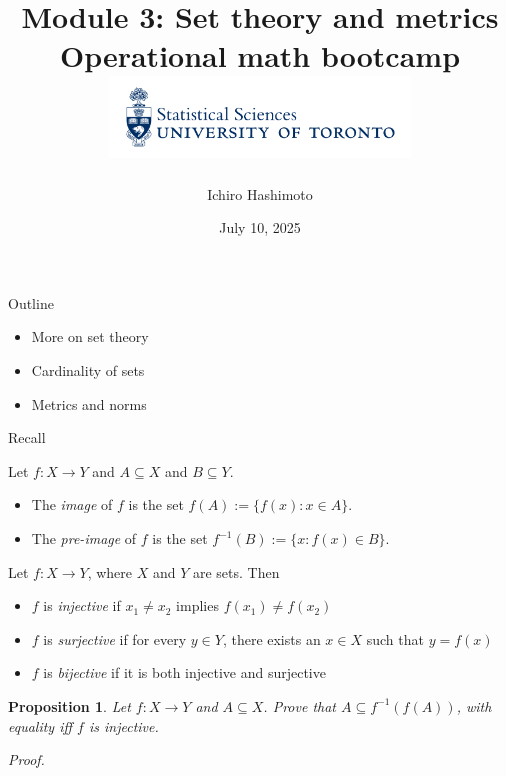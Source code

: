 \documentclass [aspectratio=169]{beamer}
\title[]{Module 3: Set theory and metrics \\ {\large Operational math bootcamp}\\ \includegraphics[width=8cm]{dept_logo.png}\vspace{-1em}}
\author[]{Ichiro Hashimoto}
\institute[]{University of Toronto}
\date{July 10,  2025}
\newtheorem{proposition}[theorem]{Proposition}
\begin{document}
{
\begin{frame}
    \titlepage
\end{frame}
}

\begin{frame}{Outline}
    \begin{itemize}
      \setlength\itemsep{1em}
    	\item More on set theory
	\item Cardinality of sets
	\item Metrics and norms
    \end{itemize}
\end{frame}

\begin{frame}{Recall}
\begin{definition}
Let $f:X \to Y$ and $A \subseteq X$ and $B \subseteq Y$. 
\begin{itemize}
\item The \emph{image} of $f$ is the set $f(A) := \{f(x): x \in A \}$.
\item The \emph{pre-image} of $f$ is the set $f^{-1}(B) := \{x: f(x) \in B \}$.
\end{itemize}
\end{definition}

\vspace{1em}


\begin{definition}
Let $f:X \to Y$, where $X$ and $Y$ are sets. Then
\begin{itemize}
    \item $f$ is \emph{injective} if $x_1 \neq x_2$ implies $f(x_1) \neq f(x_2)$
    \item $f$ is \emph{surjective} if for every $y \in Y$, there exists an $x \in X$ such that $y = f(x)$
    \item $f$ is \emph{bijective} if it is both injective and surjective
\end{itemize}
\end{definition}

\end{frame}

\begin{frame}
\begin{proposition}
Let $f: X \to Y$ and $A \subseteq X$. Prove that $A \subseteq f^{-1}(f(A))$, with equality iff $f$ is injective. 
\end{proposition}
\textit{Proof.}

\vspace{4.5cm}


\end{frame}
\end{document}
